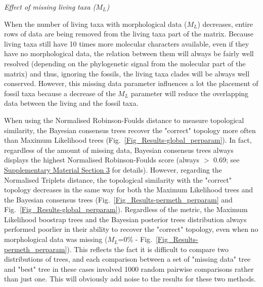 \documentclass[12pt,letterpaper]{article}
\renewcommand{\subsection}[1]{%
\bigskip
\begin{center}
\begin{large}
\normalfont\itshape #1
\end{large}
\end{center}}
\begin{document}
\subsection{Effect of missing living taxa ($M_{L}$)} %
When the number of living taxa with morphological data ($M_{L}$) decreases, entire rows of data are being removed from the living taxa part of the matrix. Because living taxa still have 10 times more molecular characters available, even if they have no morphological data, the relation between them will always be fairly well resolved (depending on the phylogenetic signal from the molecular part of the matrix) and thus, ignoring the fossils, the living taxa clades will be always well conserved. However, this missing data parameter influences a lot the placement of fossil taxa because a decrease of the $M_{L}$ parameter will reduce the overlapping data between the living and the fossil taxa.

When using the Normalised Robinson-Foulds distance to measure topological similarity, the Bayesian consensus trees recover the "correct" topology more often than Maximum Likelihood trees (Fig.~\ref{Fig_Results-global_perparam}). In fact, regardless of the amount of missing data, Bayesian consensus trees always displays the highest Normalised Robinson-Foulds score (always $>$ 0.69; see \hyperref[SupplementaryMaterial]{Supplementary Material Section 3} for details). However, regarding the Normalised Triplets distance, the topological similarity with the "correct" topology decreases in the same way for both the Maximum Likelihood trees and the Bayesian consensus trees (Fig.~\ref{Fig_Results-permeth_perparam} and Fig.~\ref{Fig_Results-global_perparam}).
Regardless of the metric, the Maximum Likelihood boostrap trees and the Bayesian posterior trees distribution always performed poorlier in their ability to recover the "correct" topology, even when no morphological data was missing ($M_{L}$=0\% - Fig.~\ref{Fig_Results-permeth_perparam}). This reflects the fact it is difficult to compare two distributions of trees, and each comparison between a set of "missing data" tree and "best" tree in these cases involved 1000 random pairwise comparisons rather than just one. This will obviously add noise to the results for these two methods.
\end{document}
